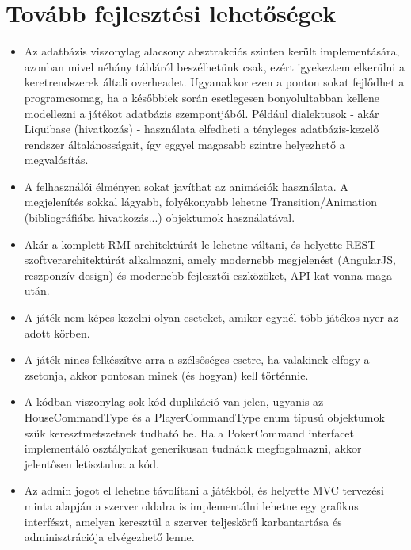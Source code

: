 \section{Tovább fejlesztési lehetőségek}
\begin{itemize}
\item Az adatbázis viszonylag alacsony absztrakciós szinten került implementására, azonban mivel néhány tábláról beszélhetünk csak, ezért igyekeztem elkerülni a keretrendszerek általi overheadet. Ugyanakkor ezen a ponton sokat fejlődhet a programcsomag, ha a későbbiek során esetlegesen bonyolultabban kellene modellezni a játékot adatbázis szempontjából. Például dialektusok - akár Liquibase (hivatkozás) - használata elfedheti a tényleges adatbázis-kezelő rendszer általánosságait, így eggyel magasabb szintre helyezhető a megvalósítás.
\item A felhasználói élményen sokat javíthat az animációk használata. A megjelenítés sokkal lágyabb, folyékonyabb lehetne Transition/Animation (bibliográfiába hivatkozás...) objektumok használatával.
\item Akár a komplett RMI architektúrát le lehetne váltani, és helyette REST szoftverarchitektúrát alkalmazni, amely modernebb megjelenést (AngularJS, reszponzív design) és modernebb fejlesztői eszközöket, API-kat vonna maga után.
\item A játék nem képes kezelni olyan eseteket, amikor egynél több játékos nyer az adott körben.
\item A játék nincs felkészítve arra a szélsőséges esetre, ha valakinek elfogy a zsetonja, akkor pontosan minek (és hogyan) kell történnie.
\item A kódban viszonylag sok kód duplikáció van jelen, ugyanis az HouseCommandType és a PlayerCommandType enum típusú objektumok szűk keresztmetszetnek tudható be. Ha a PokerCommand interfacet implementáló osztályokat generikusan tudnánk megfogalmazni, akkor jelentősen letisztulna a kód.
\item Az admin jogot el lehetne távolítani a játékból, és helyette MVC tervezési minta alapján a szerver oldalra is implementálni lehetne egy grafikus interfészt, amelyen keresztül a szerver teljeskörű karbantartása és adminisztrációja elvégezhető lenne.
\end{itemize}


\clearpage
